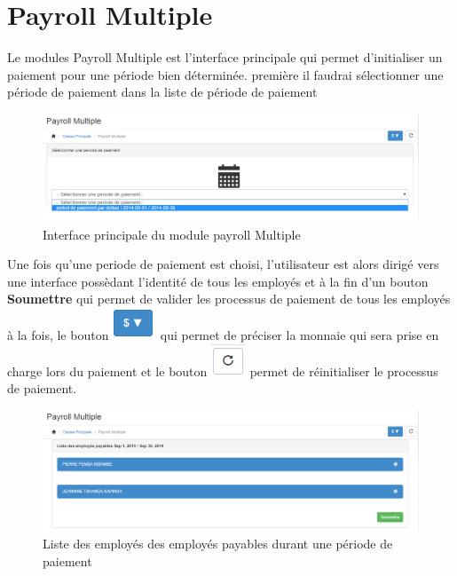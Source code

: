 \documentclass[12pt,a4paper]{report}
\begin{document}
\section{Payroll Multiple}
Le modules Payroll Multiple est l'interface principale qui permet d'initialiser un paiement pour une période bien déterminée.
première il faudrai sélectionner une période de paiement dans la liste de période de paiement

\begin{figure}[h]
\begin{center}
\includegraphics[width=14cm]{pic/MultiPayroll.png}
\end{center}
\caption{Interface principale du module payroll Multiple}
\label{Interface principale du module payroll Multiple}
\end{figure}
\newpage
Une fois qu'une periode de paiement est choisi, l'utilisateur est alors dirigé vers une interface possèdant l'identité de tous les employés et à la fin d'un bouton \textbf{Soumettre} qui permet de valider les processus de paiement de tous les employés à la fois, le bouton \includegraphics[scale=0.7]{pic/selectCurrency.png} qui permet de préciser la monnaie qui sera prise en charge lors du paiement et le bouton \includegraphics[scale=0.7]{pic/refresh.png} permet de réinitialiser le processus de paiement.

\begin{figure}[h]
\begin{center}
\includegraphics[width=14cm]{pic/PayrollListeEmp.png}
\end{center}
\caption{Liste des employés des employés payables durant une période de paiement}
\label{Liste des employés des employés payables durant une période de paiement}
\end{figure}
\end{document}
